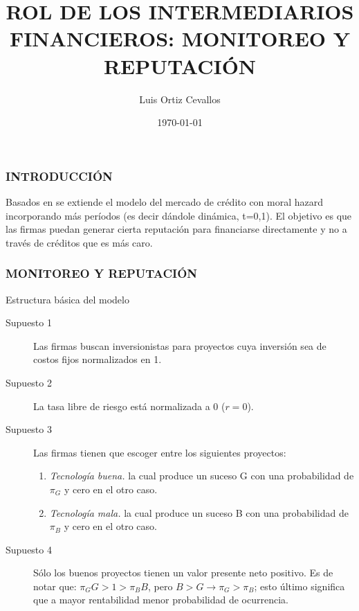 \documentclass[10pt, xcolor=table, x11names]{beamer}
\title[]{ROL DE LOS INTERMEDIARIOS FINANCIEROS: MONITOREO Y REPUTACIÓN}
\author[Luis Ortiz]{Luis Ortiz Cevallos}
\institute[SECMCA]{\bf SECMCA}
\date[\today]{\footnotesize \today}
\begin{document}
\begin{frame}
\titlepage
\end{frame}




\begin{frame}
	\frametitle{{\normalsize INTRODUCCIÓN} {}}
Basados en  \cite{Diamond1991} se extiende el modelo del mercado de crédito con moral hazard incorporando más períodos (es decir dándole dinámica, t=0,1). El objetivo es que las firmas puedan generar cierta reputación para financiarse directamente y no a través de créditos que es más caro.

 

\end{frame}

\begin{frame}
    \frametitle{{\normalsize MONITOREO Y REPUTACIÓN} {}}
    
    \begin{block} {Estructura básica del modelo}
        \begin{description}
              \item[Supuesto 1]  Las firmas buscan inversionistas para proyectos cuya inversión sea de costos fijos normalizados en 1.
            \item[Supuesto 2] La tasa libre de riesgo está normalizada a 0 ($r=0$). 
            \item[Supuesto 3] Las firmas tienen que escoger entre los siguientes proyectos:
            \begin{enumerate}
               \item \textit{Tecnología buena.} la cual produce un suceso G con una probabilidad de $\pi_{G} $ y cero en el otro caso.
               \item \textit{Tecnología mala.} la cual produce un suceso B con una probabilidad de $\pi_{B} $ y cero en el otro caso.
            \end{enumerate}
            \item[Supuesto 4] Sólo los buenos proyectos tienen un valor presente neto positivo. Es de notar que: $\pi_{G}G>1>\pi_{B}B $, pero $B>G\rightarrow \pi_{G}>\pi_{B} $; esto último significa que a mayor rentabilidad menor probabilidad de ocurrencia. 
           
             
            \end{description}
        
    \end{block}	
    
\end{frame}
\end{document}
